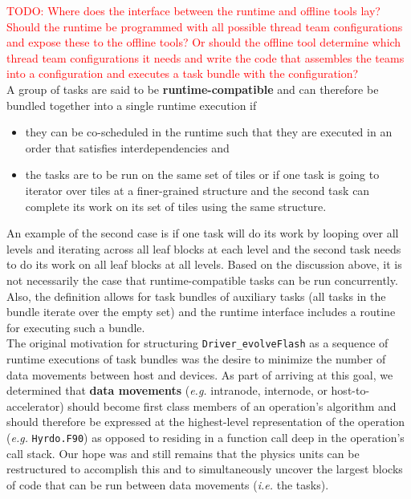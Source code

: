 \documentclass{article}
\begin{document}
\textcolor{red}{TODO: Where does the interface between the runtime and offline
tools lay?  Should the runtime be programmed with all possible thread team
configurations and expose these to the offline tools?  Or should the offline
tool determine which thread team configurations it needs and write the code
that assembles the teams into a configuration and executes a task bundle with
the configuration?}\\

A group of tasks are said to be \textbf{runtime-compatible} and can therefore be
bundled together into a single runtime execution if
\begin{itemize}
\item{they can be co-scheduled in the runtime such that they are executed in an
order that satisfies interdependencies and}
\item{the tasks are to be run on the same set of tiles or if one task is going
to iterator over tiles at a finer-grained structure and the second task can
complete its work on its set of tiles using the same structure.}
\end{itemize}
An example of the second case is if one task
will do its work by looping over all levels and iterating across all leaf blocks
at each level and the second task needs to do its work on all leaf blocks at all
levels.  Based on the discussion above, it is not necessarily the case that
runtime-compatible tasks can be run concurrently.  Also, the definition allows
for task bundles of auxiliary tasks (all tasks in the bundle iterate over the
empty set) and the runtime interface includes a routine for executing such a
bundle.\\

The original motivation for structuring \texttt{Driver\_evolveFlash} as a
sequence of runtime executions of task bundles was the desire to minimize the
number of data movements between host and devices.  As part of arriving at this
goal, we determined that \textbf{data movements} (\textit{e.g.} intranode,
internode, or host-to-accelerator) should become first class members of an
operation's algorithm and should therefore be expressed at the highest-level
representation of the operation (\textit{e.g.} \texttt{Hyrdo.F90}) as opposed
to residing in a function call deep in the operation's call stack.  Our hope was and still
remains that the physics units can be restructured to accomplish this and to
simultaneously uncover the largest blocks of code that can be run between data
movements (\textit{i.e.} the tasks).\\
\end{document}
